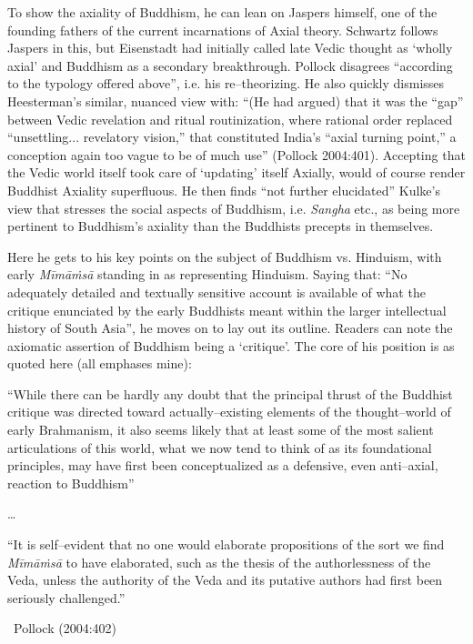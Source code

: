 To show the axiality of Buddhism, he can lean on Jaspers himself, one of the founding fathers of the current incarnations of Axial theory. Schwartz follows Jaspers in this, but Eisenstadt had initially called late Vedic thought as ‘wholly axial’ and Buddhism as a secondary breakthrough. Pollock disagrees “according to the typology offered above”, i.e. his re–theorizing. He also quickly dismisses Heesterman’s similar, nuanced view with: “(He had argued) that it was the “gap” between Vedic revelation and ritual routinization, where rational order replaced “unsettling... revelatory vision,” that constituted India’s “axial turning point,” a conception again too vague to be of much use” (Pollock 2004:401). Accepting that the Vedic world itself took care of ‘updating’ itself Axially, would of course render Buddhist Axiality superfluous. He then finds “not further elucidated” Kulke’s view that stresses the social aspects of Buddhism, i.e. \textit{Sangha} etc., as being more pertinent to Buddhism’s axiality than the Buddhists precepts in themselves.

Here he gets to his key points on the subject of Buddhism vs. Hinduism, with early \textit{Mīmāṁsā} standing in as representing Hinduism. Saying that: “No adequately detailed and textually sensitive account is available of what the critique enunciated by the early Buddhists meant within the larger intellectual history of South Asia”, he moves on to lay out its outline. Readers can note the axiomatic assertion of Buddhism being a ‘critique’. The core of his position is as quoted here (all emphases mine):

\begin{myquote}
“While there can be hardly any doubt that the principal thrust of the Buddhist critique was directed toward actually–existing elements of the thought–world of early Brahmanism, it also seems likely that at least some of the most salient articulations of this world, what we now tend to think of as its foundational principles, may have first been conceptualized as a defensive, even anti–axial, reaction to Buddhism”
\end{myquote}

\begin{myquote}
…
\end{myquote}

\begin{myquote}
“It is self–evident that no one would elaborate propositions of the sort we find \textit{Mīmāṁsā} to have elaborated, such as the thesis of the authorlessness of the Veda, unless the authority of the Veda and its putative authors had first been seriously challenged.” 

~\hfill Pollock (2004:402)
\end{myquote}

